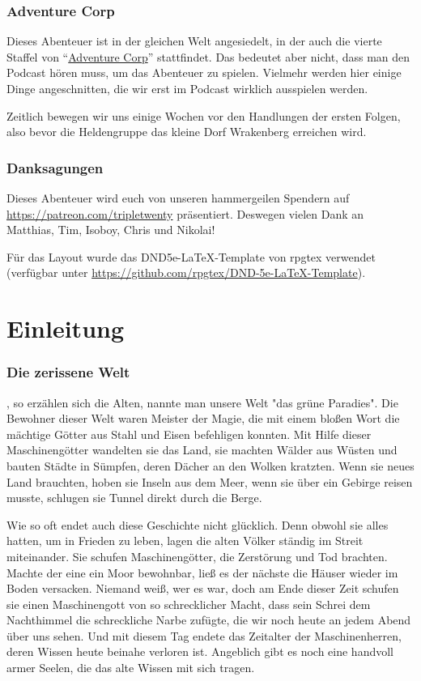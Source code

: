 \subsection{Adventure Corp}

Dieses Abenteuer ist in der gleichen Welt angesiedelt, in der auch die vierte Staffel von ``\href{https://tripletwenty.net/2020/01/07/adventure-corp-s4e01/}{Adventure Corp}'' stattfindet. Das bedeutet aber nicht, dass man den Podcast hören muss, um das Abenteuer zu spielen. Vielmehr werden hier einige Dinge angeschnitten, die wir erst im Podcast wirklich ausspielen werden.

Zeitlich bewegen wir uns einige Wochen vor den Handlungen der ersten Folgen, also bevor die Heldengruppe das kleine Dorf Wrakenberg erreichen wird.

\subsection{Danksagungen}

Dieses Abenteuer wird euch von unseren hammergeilen Spendern auf \url{https://patreon.com/tripletwenty} präsentiert. Deswegen vielen Dank an Matthias, Tim, Isoboy, Chris und Nikolai!

Für das Layout wurde das DND5e-LaTeX-Template von rpgtex verwendet (verfügbar unter \url{https://github.com/rpgtex/DND-5e-LaTeX-Template}).


\chapter*{Einleitung}

\subsection{Die zerissene Welt}

, so erzählen sich die Alten, nannte man unsere Welt "das grüne Paradies". Die Bewohner dieser Welt waren Meister der Magie, die mit einem bloßen Wort die mächtige Götter aus Stahl und Eisen befehligen konnten. Mit Hilfe dieser Maschinengötter wandelten sie das Land, sie machten Wälder aus Wüsten und bauten Städte in Sümpfen, deren Dächer an den Wolken kratzten. Wenn sie neues Land brauchten, hoben sie Inseln aus dem Meer, wenn sie über ein Gebirge reisen musste, schlugen sie Tunnel direkt durch die Berge.

Wie so oft endet auch diese Geschichte nicht glücklich. Denn obwohl sie alles hatten, um in Frieden zu leben, lagen die alten Völker ständig im Streit miteinander. Sie schufen Maschinengötter, die Zerstörung und Tod brachten. Machte der eine ein Moor bewohnbar, ließ es der nächste die Häuser wieder im Boden versacken. Niemand weiß, wer es war, doch am Ende dieser Zeit schufen sie einen Maschinengott von so schrecklicher Macht, dass sein Schrei dem Nachthimmel die schreckliche Narbe zufügte, die wir noch heute an jedem Abend über uns sehen. Und mit diesem Tag endete das Zeitalter der Maschinenherren, deren Wissen heute beinahe verloren ist. Angeblich gibt es noch eine handvoll armer Seelen, die das alte Wissen mit sich tragen.


